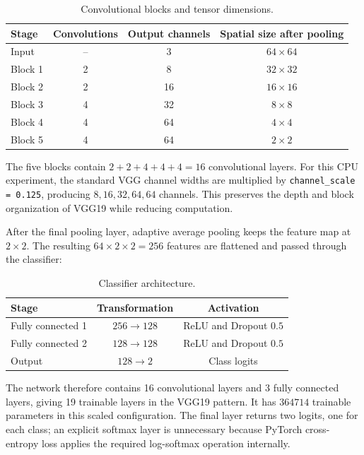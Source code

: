 \documentclass[12pt,a4paper]{article}
\begin{document}
\begin{table}[H]
\centering
\begin{tabular}{lccc}
\toprule
Stage & Convolutions & Output channels & Spatial size after pooling \\
\midrule
Input & -- & 3 & \(64 \times 64\) \\
Block 1 & 2 & 8 & \(32 \times 32\) \\
Block 2 & 2 & 16 & \(16 \times 16\) \\
Block 3 & 4 & 32 & \(8 \times 8\) \\
Block 4 & 4 & 64 & \(4 \times 4\) \\
Block 5 & 4 & 64 & \(2 \times 2\) \\
\bottomrule
\end{tabular}
\caption{Convolutional blocks and tensor dimensions.}
\end{table}

The five blocks contain \(2+2+4+4+4=16\) convolutional layers.
For this CPU experiment, the standard VGG channel widths are multiplied by \texttt{channel\_scale = 0.125}, producing \(8,16,32,64,64\) channels.
This preserves the depth and block organization of VGG19 while reducing computation.

After the final pooling layer, adaptive average pooling keeps the feature map at \(2 \times 2\).
The resulting \(64 \times 2 \times 2=256\) features are flattened and passed through the classifier:

\begin{table}[H]
\centering
\begin{tabular}{lcc}
\toprule
Stage & Transformation & Activation \\
\midrule
Fully connected 1 & \(256 \rightarrow 128\) & ReLU and Dropout \(0.5\) \\
Fully connected 2 & \(128 \rightarrow 128\) & ReLU and Dropout \(0.5\) \\
Output & \(128 \rightarrow 2\) & Class logits \\
\bottomrule
\end{tabular}
\caption{Classifier architecture.}
\end{table}

The network therefore contains 16 convolutional layers and 3 fully connected layers, giving 19 trainable layers in the VGG19 pattern.
It has \(364714\) trainable parameters in this scaled configuration.
The final layer returns two logits, one for each class; an explicit softmax layer is unnecessary because PyTorch cross-entropy loss applies the required log-softmax operation internally.
\end{document}
